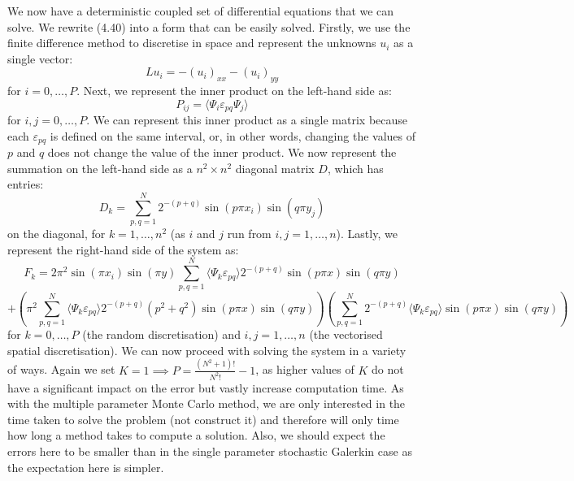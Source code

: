 \documentclass[11pt]{article}
\numberwithin{equation}{section}
\begin{document}
We now have a deterministic coupled set of differential equations that we can solve. We rewrite (4.40) into a form that can be easily solved. Firstly, we use the finite difference method to discretise in space and represent the unknowns $u_i$ as a single vector:
\begin{equation}
Lu_i = - (u_i)_{xx} - (u_i)_{yy}
\end{equation}
for $i=0,\dots,P$. Next, we represent the inner product on the left-hand side as:
\begin{equation}
P_{ij} = \langle \Psi_i \varepsilon_{pq} \Psi_j \rangle
\end{equation}
for $i,j=0,\dots,P$. We can represent this inner product as a single matrix because each $\varepsilon_{pq}$ is defined on the same interval, or, in other words, changing the values of $p$ and $q$ does not change the value of the inner product. We now represent the summation on the left-hand side as a $n^2 \times n^2$ diagonal matrix $D$, which has entries:
\begin{equation}
D_k = \sum_{p,q=1}^N 2^{-(p+q)} \sin(p \pi x_i) \sin(q \pi y_j)
\end{equation}
on the diagonal, for $k=1,\dots,n^2$ (as $i$ and $j$ run from $i,j=1,\dots,n$). Lastly, we represent the right-hand side of the system as:
\begin{equation}
F_k = 2 \pi^2 \sin(\pi x_i) \sin(\pi y) \sum_{p,q=1}^N \langle \Psi_k \varepsilon_{pq} \rangle 2^{-(p+q)} \sin(p \pi x)\sin(q \pi y) \nonumber
\end{equation}
\begin{equation}
+ \left(\pi^2 \sum_{p,q=1}^N \langle \Psi_k \varepsilon_{pq} \rangle 2^{-(p+q)} (p^2 + q^2) \sin(p \pi x)\sin(q \pi y) \right) \left(\sum_{p,q=1}^N 2^{-(p+q)} \langle \Psi_k \varepsilon_{pq} \rangle \sin(p \pi x)\sin(q \pi y) \right)
\end{equation}
for $k=0,\dots,P$ (the random discretisation) and $i,j=1,\dots,n$ (the vectorised spatial discretisation). We can now proceed with solving the system in a variety of ways. Again we set $K=1 \implies P = \frac{(N^2 + 1)!}{N^2 !} - 1$, as higher values of $K$ do not have a significant impact on the error but vastly increase computation time. As with the multiple parameter Monte Carlo method, we are only interested in the time taken to solve the problem (not construct it) and therefore will only time how long a method takes to compute a solution. Also, we should expect the errors here to be smaller than in the single parameter stochastic Galerkin case as the expectation here is simpler.
\end{document}
